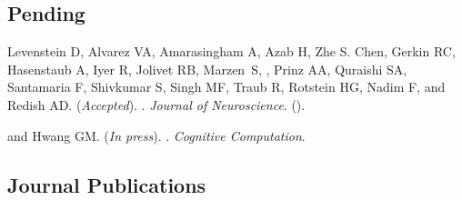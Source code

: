 \subsection*{Pending}
\label{sec:pendingpubs}

\begin{description}
  \item Levenstein D, Alvarez VA, Amarasingham A, Azab H, Zhe S. Chen, Gerkin
    RC, Hasenstaub A, Iyer R, Jolivet RB, Marzen~S, , Prinz AA,
    Quraishi SA, Santamaria F, Shivkumar S, Singh MF, Traub R, Rotstein HG, Nadim
    F, and Redish AD. (\emph{\color{lightred}Accepted}). . \emph{Journal of Neuroscience}.
    (\href{https://arxiv.org/abs/2003.13825}{}).

  \item {} and Hwang GM. (\emph{\color{lightred}In press}).
    . \emph{Cognitive Computation}.
\end{description}

\subsection*{Journal Publications}
\label{sec:journalpubs}

